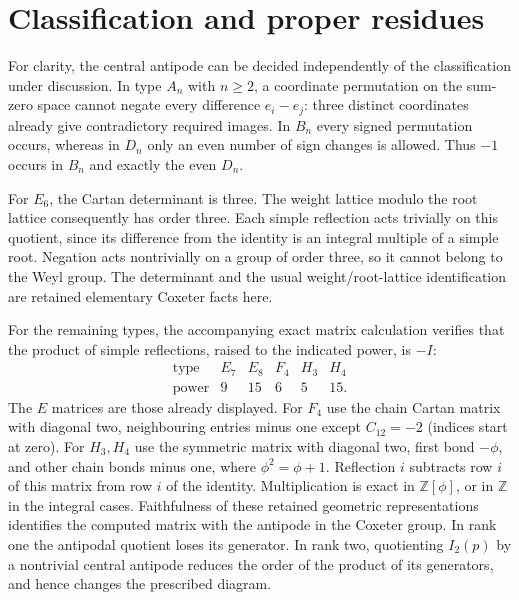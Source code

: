\documentclass[11pt,a4paper]{article}
\begin{document}
\section{Classification and proper residues}

For clarity, the central antipode can be decided independently of the
classification under discussion. In type $A_n$ with $n\geq2$, a coordinate
permutation on the sum-zero space cannot negate every difference $e_i-e_j$:
three distinct coordinates already give contradictory required images.
In $B_n$ every signed permutation occurs, whereas in $D_n$ only an even
number of sign changes is allowed. Thus $-1$ occurs in $B_n$ and exactly
the even $D_n$.

For $E_6$, the Cartan determinant is three. The weight lattice modulo the
root lattice consequently has order three. Each simple reflection acts
trivially on this quotient, since its difference from the identity is an
integral multiple of a simple root. Negation acts nontrivially on a group
of order three, so it cannot belong to the Weyl group. The determinant
and the usual weight/root-lattice identification are retained elementary
Coxeter facts here.

For the remaining types, the accompanying exact matrix calculation verifies
that the product of simple reflections, raised to the indicated power,
is $-I$:
\[
\begin{array}{c|rrrrr}
\text{type}&E_7&E_8&F_4&H_3&H_4\\\hline
\text{power}&9&15&6&5&15.
\end{array}
\]
The $E$ matrices are those already displayed. For $F_4$ use the chain
Cartan matrix with diagonal two, neighbouring entries minus one except
$C_{12}=-2$ (indices start at zero). For $H_3,H_4$ use the symmetric
matrix with diagonal two, first bond $-\phi$, and other chain bonds
minus one, where $\phi^2=\phi+1$. Reflection $i$ subtracts row $i$
of this matrix from row $i$ of the identity. Multiplication is exact in
$\mathbb Z[\phi]$, or in $\mathbb Z$ in the integral cases. Faithfulness
of these retained geometric representations identifies the computed
matrix with the antipode in the Coxeter group. In rank one the antipodal quotient
loses its generator. In rank two, quotienting $I_2(p)$ by a nontrivial
central antipode reduces the order of the product of its generators,
and hence changes the prescribed diagram.
\end{document}
